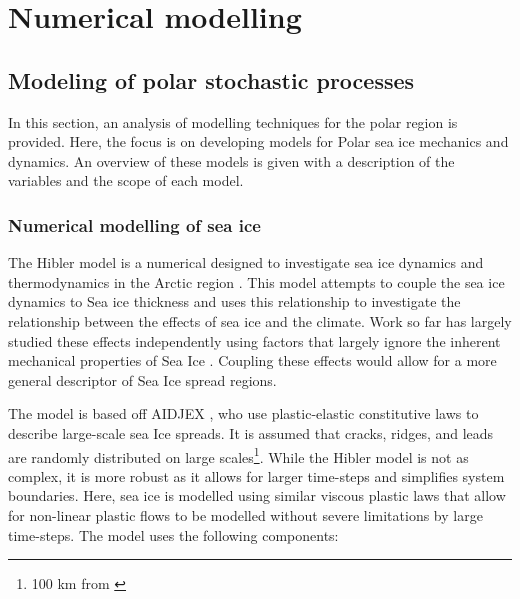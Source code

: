 \appendix

\chapter{Numerical modelling}

\section{Modeling of polar stochastic processes}
\label{app:modelling}
In this section,  an analysis of modelling techniques for the polar region is provided. Here, the focus is on developing models for Polar sea ice mechanics and dynamics. An overview of these models is given with a description of the variables and the scope of each model.

\subsection{Numerical modelling of sea ice}

The Hibler model is a numerical designed to investigate sea ice dynamics and thermodynamics in the Arctic region \cite{hibler1979dynamic}. This model attempts to couple the sea ice dynamics to Sea ice thickness and uses this relationship to investigate the relationship between the effects of sea ice and the climate. Work so far has largely studied these effects independently using factors that largely ignore the inherent mechanical properties of Sea Ice \cite{hibler1979dynamic}. Coupling these effects would allow for a more general descriptor of Sea Ice spread regions.\par

The model is based off \textcite{coon1974modeling} AIDJEX \cite{hibler1979dynamic}, who use plastic-elastic constitutive laws to describe large-scale sea Ice spreads. It is assumed that cracks, ridges, and leads are randomly distributed on large scales\footnote{100 km from \textcite{coon2007arctic}}. While the Hibler model is not as complex, it is more robust as it allows for larger time-steps and simplifies system boundaries. Here, sea ice is modelled using similar viscous plastic laws \cite{hibler1979dynamic} that allow for non-linear plastic flows to be modelled without severe limitations by large time-steps. The model uses the following components:

